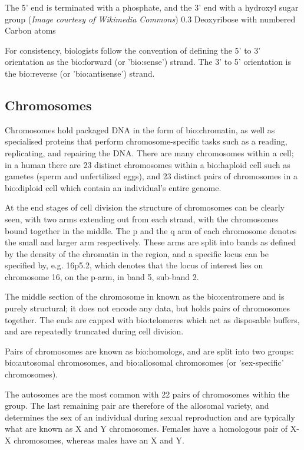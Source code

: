 {The 5' end is terminated with a phosphate, and the 3' end with a hydroxyl sugar group (\textit{Image courtesy of Wikimedia Commons})}
{}
{0.3}
{Deoxyribose with numbered Carbon atoms}

For consistency, biologists follow the convention of defining the 5' to 3' orientation as the \gls{bio:forward} (or '\gls{bio:sense}') strand. The 3' to 5' orientation is the \gls{bio:reverse} (or '\gls{bio:antisense}') strand.

\subsection{Chromosomes}

Chromosomes hold packaged DNA in the form of \gls{bio:chromatin}, as well as specialised proteins that perform chromosome-specific tasks such as a reading, replicating, and repairing the DNA. There are many chromosomes within a cell; in a human there are 23 distinct chromosomes within a \gls{bio:haploid} cell such as gametes (sperm and unfertilized eggs), and 23 distinct pairs of chromosomes in a \gls{bio:diploid} cell which contain  an individual's entire genome.

At the end stages of cell division the structure of chromosomes can be clearly seen, with two arms extending out from each strand, with the chromosomes bound together in the middle. The p and the q arm of each chromosome denotes the small and larger arm respectively. These arms are split into bands as defined by the density of the chromatin in the region, and a specific locus can be specified by, e.g. 16p5.2, which denotes that the locus of interest lies on chromosome 16, on the p-arm, in band 5, sub-band 2.

The middle section of the chromosome in known as the \gls{bio:centromere} and is purely structural; it does not encode any data, but holds pairs of chromosomes together. The ends are capped with \gls{bio:telomeres} which act as disposable buffers, and are repeatedly truncated during cell division.

Pairs of chromosomes are known as \gls{bio:homologs}, and are split into two groups: \gls{bio:autosomal} chromosomes, and \gls{bio:allosomal} chromosomes (or 'sex-specific' chromosomes).

The autosomes are the most common with 22 pairs of chromosomes within the group. The last remaining pair are therefore of the allosomal variety, and determines the sex of an individual during sexual reproduction and are typically what are known as X and Y chromosomes. Females have a homologous pair of X-X chromosomes, whereas males have an X and Y.

